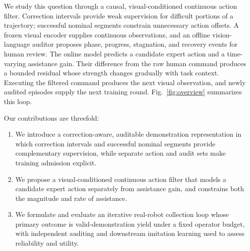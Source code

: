 We study this question through a causal, visual-conditioned continuous action
filter. Correction intervals provide weak supervision for difficult portions
of a trajectory; successful nominal segments constrain unnecessary action
offsets. A frozen visual encoder supplies continuous observations, and an
offline vision-language auditor proposes phase, progress, stagnation, and
recovery events for human review. The online model predicts a candidate expert
action and a time-varying assistance gain. Their difference from the raw human
command produces a bounded residual whose strength changes gradually with task
context. Executing the filtered command produces the next visual observation,
and newly audited episodes supply the next training round. Fig.~\ref{fig:overview}
summarizes this loop.



Our contributions are threefold:
\begin{enumerate}
  \item We introduce a correction-aware, auditable demonstration
  representation in which correction intervals and successful nominal segments
  provide complementary supervision, while separate action and audit sets make
  training admission explicit.
  \item We propose a visual-conditioned continuous action filter that models a
  candidate expert action separately from assistance gain, and constrains both
  the magnitude and rate of assistance.
  \item We formulate and evaluate an iterative real-robot collection loop whose
  primary outcome is valid-demonstration yield under a fixed operator budget,
  with independent auditing and downstream imitation learning used to assess
  reliability and utility.
\end{enumerate}
